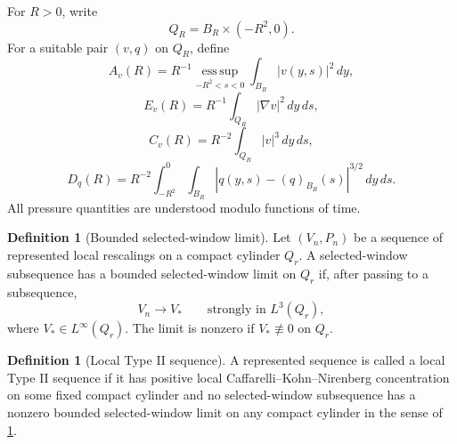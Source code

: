\documentclass[11pt]{amsart}
\theoremstyle{plain}
\theoremstyle{definition}
\newtheorem{definition}[theorem]{Definition}
\theoremstyle{remark}
\begin{document}
For \(R>0\), write
\[
  Q_R=B_R\times(-R^2,0).
\]
For a suitable pair \((v,q)\) on \(Q_R\), define
\[
  A_v(R)=R^{-1}\operatorname*{ess\,sup}_{-R^2<s<0}
  \int_{B_R}|v(y,s)|^2\,dy,
\]
\[
  E_v(R)=R^{-1}\int_{Q_R}|\nabla v|^2\,dy\,ds,
\]
\[
  C_v(R)=R^{-2}\int_{Q_R}|v|^3\,dy\,ds,
\]
\[
  D_q(R)=R^{-2}\int_{-R^2}^0\int_{B_R}
  |q(y,s)-(q)_{B_R}(s)|^{3/2}\,dy\,ds.
\]
All pressure quantities are understood modulo functions of time.

\begin{definition}[Bounded selected-window limit]\label{def:bounded-window-limit}
Let \((V_n,P_n)\) be a sequence of represented local rescalings on a compact
cylinder \(Q_r\).  A selected-window subsequence has a bounded selected-window limit
on \(Q_r\) if, after passing to a subsequence,
\[
  V_n\to V_*
  \qquad\text{strongly in }L^3(Q_r),
\]
where \(V_*\in L^\infty(Q_r)\).  The limit is nonzero if
\(V_*\not\equiv0\) on \(Q_r\).
\end{definition}

\begin{definition}[Local Type II sequence]\label{def:typeII}
A represented sequence is called a local Type II sequence if it has positive
local Caffarelli--Kohn--Nirenberg concentration on some fixed compact cylinder
and no selected-window subsequence has a nonzero bounded selected-window limit on
any compact cylinder in the sense of \cref{def:bounded-window-limit}.
\end{definition}
\end{document}
